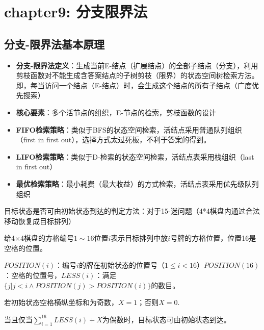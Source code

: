\documentclass[./../main.tex]{subfiles}
\begin{document}
\section{chapter9: 分支限界法}
\subsection{分支-限界法基本原理}
\begin{itemize}
    \item \textbf{分支-限界法定义}：生成当前E-结点（扩展结点）的全部子结点（分支），利用剪枝函数对不能生成含答案结点的子树剪枝（限界）的状态空间树检索方法。即，每当访问一个结点（E-结点）时，会生成这个结点的所有子结点（广度优先搜索）
    
    \item \textbf{核心要素}：多个活节点的组织，E-节点的检索，剪枝函数的设计
    
    \item \textbf{FIFO检索策略}：类似于BFS的状态空间检索，活结点采用普通队列组织（first in first out），选择方式太过死板，不利于答案的得到。
    
    \item \textbf{LIFO检索策略}：类似于D-检索的状态空间检索，活结点表采用栈组织（last in first out）
    
    \item \textbf{最优检索策略}：最小耗费（最大收益）的方式检索，活结点表采用优先级队列组织
\end{itemize}

目标状态是否可由初始状态到达的判定方法：对于15-迷问题（4*4棋盘内通过合法移动恢复成目标排列）

给4×4棋盘的方格编号$1\sim16$位置$i$表示目标排列中放$i$号牌的方格位置，位置16是空格的位置。

$POSITION(i)$：编号$i$的牌在初始状态的位置号（$1\leq i<16$）$POSITION(16)$：空格的位置号，$LESS(i)$：满足$\{j | j<i \land POSITION(j)>POSITION(i)\}$的数目。

若初始状态空格横纵坐标和为奇数，$X=1$；否则$X=0$.

当且仅当$\sum_{i=1}^{16}LESS(i) + X$为偶数时，目标状态可由初始状态到达。
\end{document}
